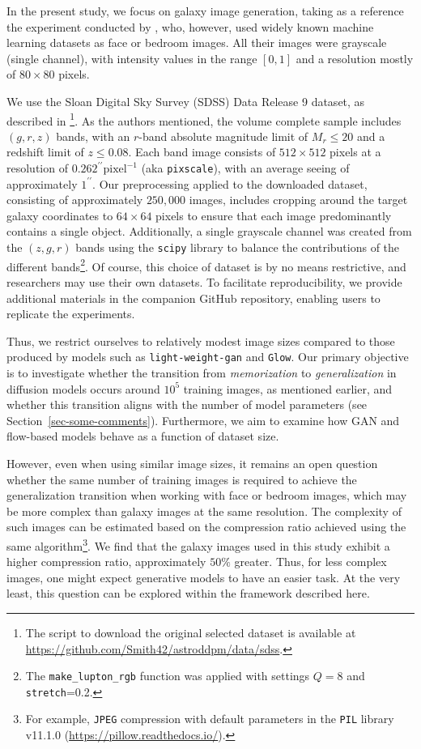 \documentclass[fleqn,usenatbib]{mnras}
\begin{document}
{\color{red}
In the present study, we focus on galaxy image generation, taking as a reference the experiment conducted by \cite{kadkhodaie2024generalization}, who, however, used widely known machine learning datasets as face or bedroom images. All their images were grayscale (single channel), with intensity values in the range $[0,1]$ and a resolution mostly of $80 \times 80$ pixels.

We use the Sloan Digital Sky Survey (SDSS) Data Release 9 dataset, as described in \citep{smith2021}\footnote{The script to download the original selected dataset is available at \url{https://github.com/Smith42/astroddpm/data/sdss}.}. As the authors mentioned, the volume complete sample includes $(g,r,z)$ bands, with an $r$-band absolute magnitude limit of $M_r\leq 20$ and a redshift limit of $z\leq 0.08$. Each band image consists of $512\times 512$ pixels at a resolution of $0.262^{\prime\prime} \mathrm{pixel}^{-1}$ (aka \texttt{pixscale}), with an average seeing of approximately $1^{\prime\prime}$. Our preprocessing applied to the downloaded dataset, consisting of approximately $250,000$ images, includes cropping around the target galaxy coordinates to $64 \times 64$ pixels to ensure that each image predominantly contains a single object. Additionally, a single grayscale channel was created from the $(z, g, r)$ bands using the \texttt{scipy} \citep{2020SciPy-NMeth} library to balance the contributions of the different bands\footnote{The \texttt{make\_lupton\_rgb} function was applied with settings $Q=8$ and \texttt{stretch}=0.2.}. Of course, this choice of dataset is by no means restrictive, and researchers may use their own datasets. To facilitate reproducibility, we provide additional materials in the companion GitHub repository, enabling users to replicate the experiments.

Thus, we restrict ourselves to relatively modest image sizes compared to those produced by models such as \texttt{light-weight-gan} and \texttt{Glow}. Our primary objective is to investigate whether the transition from \textit{memorization} to \textit{generalization} in diffusion models occurs around $10^5$ training images, as mentioned earlier, and whether this transition aligns with the number of model parameters (see Section~\ref{sec-some-comments}). Furthermore, we aim to examine how GAN and flow-based models behave as a function of dataset size. 


However, even when using similar image sizes, it remains an open question whether the same number of training images is required to achieve the generalization transition when working with face or bedroom images, which may be more complex than galaxy images at the same resolution. The complexity of such images can be estimated based on the compression ratio achieved using the same algorithm\footnote{For example, \texttt{JPEG} compression with default parameters in the \texttt{PIL} library v11.1.0 (\url{https://pillow.readthedocs.io/}).}. We find that the galaxy images used in this study exhibit a higher compression ratio, approximately $50\%$ greater. Thus, for less complex images, one might expect generative models to have an easier task. At the very least, this question can be explored within the framework described here.
}
\end{document}

